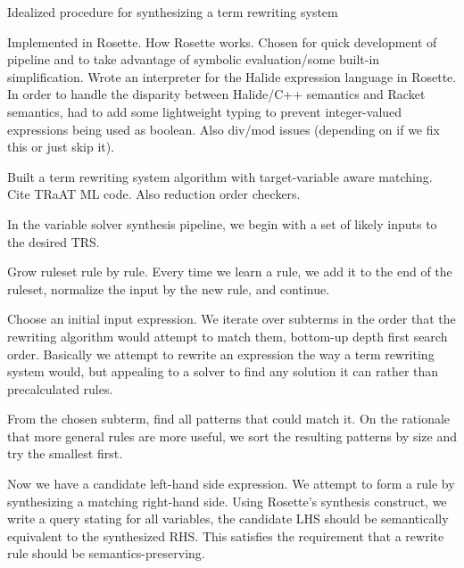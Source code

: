 \begin{algorithm}[H]
\SetAlgoLined
{}
\caption{Idealized procedure for synthesizing a term rewriting system}
\label{algo:synthesis}
\end{algorithm}


Implemented in Rosette. How Rosette works. Chosen for quick development of pipeline and to take advantage of symbolic evaluation/some built-in simplification. Wrote an interpreter for the Halide expression language in Rosette. In order to handle the disparity between Halide/C++ semantics and Racket semantics, had to add some lightweight typing to prevent integer-valued expressions being used as boolean. Also div/mod issues (depending on if we fix this or just skip it).

Built a term rewriting system algorithm with target-variable aware matching. Cite TRaAT ML code. Also reduction order checkers.

In the variable solver synthesis pipeline, we begin with a set of likely inputs to the desired TRS. 

Grow ruleset rule by rule. Every time we learn a rule, we add it to the end of the ruleset, normalize the input by the new rule, and continue.

Choose an initial input expression. We iterate over subterms in the order that the rewriting algorithm would attempt to match them, bottom-up depth first search order. Basically we attempt to rewrite an expression the way a term rewriting system would, but appealing to a solver to find any solution it can rather than precalculated rules.

From the chosen subterm, find all patterns that could match it. On the rationale that more general rules are more useful, we sort the resulting patterns by size and try the smallest first.

Now we have a candidate left-hand side expression. We attempt to form a rule by synthesizing a matching right-hand side. Using Rosette's synthesis construct, we write a query stating for all variables, the candidate LHS should be semantically equivalent to the synthesized RHS. This satisfies the requirement that a rewrite rule should be semantics-preserving.

